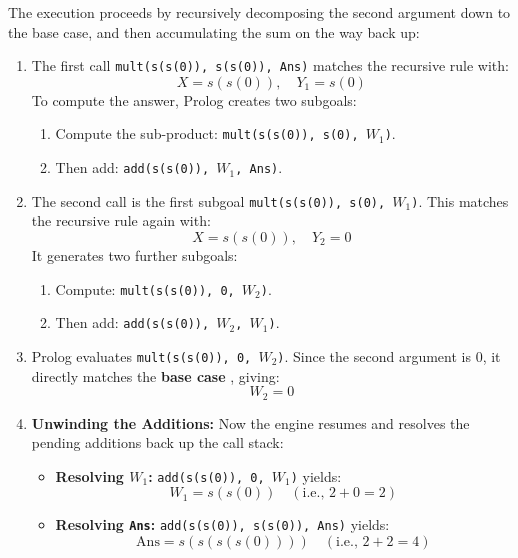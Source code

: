 The execution proceeds by recursively decomposing the second argument down to the base case, and then accumulating the sum on the way back up:

\begin{enumerate}[label=\textbf{Step \arabic*:}, leftmargin=*]
    \item The first call \texttt{mult(s(s(0)), s(s(0)), Ans)} matches the recursive rule with:
    \[
    X = s(s(0)), \quad Y_1 = s(0)
    \]
    To compute the answer, Prolog creates two subgoals:
    \begin{enumerate}[label=(\alph*)]
        \item Compute the sub-product: \texttt{mult(s(s(0)), s(0), $W_1$)}.
        \item Then add: \texttt{add(s(s(0)), $W_1$, Ans)}.
    \end{enumerate}

    \item The second call is the first subgoal \texttt{mult(s(s(0)), s(0), $W_1$)}. This matches the recursive rule again with:
    \[
    X = s(s(0)), \quad Y_2 = 0
    \]
    It generates two further subgoals:
    \begin{enumerate}[label=(\alph*)]
        \item Compute: \texttt{mult(s(s(0)), 0, $W_2$)}.
        \item Then add: \texttt{add(s(s(0)), $W_2$, $W_1$)}.
    \end{enumerate}

    \item Prolog evaluates \texttt{mult(s(s(0)), 0, $W_2$)}. Since the second argument is $0$, it directly matches the \textbf{base case} , giving:
    \[
    W_2 = 0
    \]

    \item \textbf{Unwinding the Additions:}
    Now the engine resumes and resolves the pending additions back up the call stack:
    \begin{itemize}
        \item \textbf{Resolving $W_1$:} \texttt{add(s(s(0)), 0, $W_1$)} yields:
        \[
        W_1 = s(s(0)) \quad (\text{i.e., } 2 + 0 = 2)
        \]
        \item \textbf{Resolving \texttt{Ans}:} \texttt{add(s(s(0)), s(s(0)), Ans)} yields:
        \[
        \text{Ans} = s(s(s(s(0)))) \quad (\text{i.e., } 2 + 2 = 4)
        \]
    \end{itemize}
\end{enumerate}

